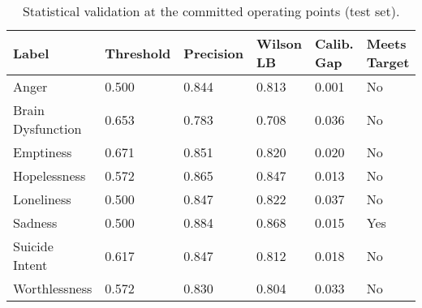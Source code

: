 \begin{table}
\caption{Statistical validation at the committed operating points (test set).}
\label{tab:stat_validation}
\begin{tabular}{llllll}
\toprule
Label & Threshold & Precision & Wilson LB & Calib. Gap & Meets Target \\
\midrule
Anger & 0.500 & 0.844 & 0.813 & 0.001 & No \\
Brain Dysfunction & 0.653 & 0.783 & 0.708 & 0.036 & No \\
Emptiness & 0.671 & 0.851 & 0.820 & 0.020 & No \\
Hopelessness & 0.572 & 0.865 & 0.847 & 0.013 & No \\
Loneliness & 0.500 & 0.847 & 0.822 & 0.037 & No \\
Sadness & 0.500 & 0.884 & 0.868 & 0.015 & Yes \\
Suicide Intent & 0.617 & 0.847 & 0.812 & 0.018 & No \\
Worthlessness & 0.572 & 0.830 & 0.804 & 0.033 & No \\
\bottomrule
\end{tabular}
\end{table}
